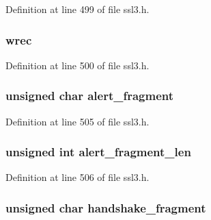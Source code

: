 Definition at line 499 of file ssl3.\+h.

\subsubsection[{\texorpdfstring{wrec}{wrec}}]{ wrec}\hypertarget{structssl3__state__st_ace5a0cf461da04317868b86d3652e48b}{}\label{structssl3__state__st_ace5a0cf461da04317868b86d3652e48b}


Definition at line 500 of file ssl3.\+h.

\subsubsection[{\texorpdfstring{alert\+\_\+fragment}{alert_fragment}}]{\setlength{\rightskip}{0pt plus 5cm}unsigned char alert\+\_\+fragment}\hypertarget{structssl3__state__st_a64c1fbc616e3f83cb8d283fe6268131c}{}\label{structssl3__state__st_a64c1fbc616e3f83cb8d283fe6268131c}


Definition at line 505 of file ssl3.\+h.

\subsubsection[{\texorpdfstring{alert\+\_\+fragment\+\_\+len}{alert_fragment_len}}]{\setlength{\rightskip}{0pt plus 5cm}unsigned int alert\+\_\+fragment\+\_\+len}\hypertarget{structssl3__state__st_a549080e51b089972f50c13c3d2c0edf3}{}\label{structssl3__state__st_a549080e51b089972f50c13c3d2c0edf3}


Definition at line 506 of file ssl3.\+h.

\subsubsection[{\texorpdfstring{handshake\+\_\+fragment}{handshake_fragment}}]{\setlength{\rightskip}{0pt plus 5cm}unsigned char handshake\+\_\+fragment}\hypertarget{structssl3__state__st_adddf37c3bb729c91cbd4b9e971c1706d}{}\label{structssl3__state__st_adddf37c3bb729c91cbd4b9e971c1706d}


